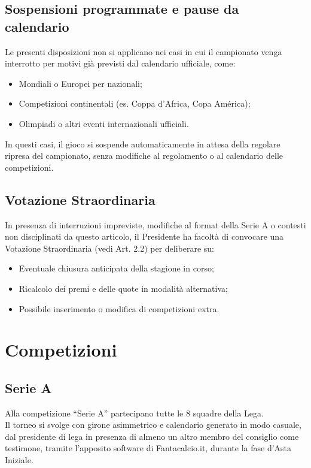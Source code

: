 \section{Sospensioni programmate e pause da calendario}
\label{art:7.3}

Le presenti disposizioni non si applicano nei casi in cui il campionato venga interrotto per motivi già previsti dal calendario ufficiale, come:
\begin{itemize}
  \item Mondiali o Europei per nazionali;
  \item Competizioni continentali (es. Coppa d’Africa, Copa América);
  \item Olimpiadi o altri eventi internazionali ufficiali.
\end{itemize}

In questi casi, il gioco si sospende automaticamente in attesa della regolare ripresa del campionato, senza modifiche al regolamento o al calendario delle competizioni.

\section{Votazione Straordinaria}
\label{art:7.4}

In presenza di interruzioni impreviste, modifiche al format della Serie A o contesti non disciplinati da questo articolo, il Presidente ha facoltà di convocare una Votazione Straordinaria (vedi Art. 2.2) per deliberare su:
\begin{itemize}
  \item Eventuale chiusura anticipata della stagione in corso;
  \item Ricalcolo dei premi e delle quote in modalità alternativa;
  \item Possibile inserimento o modifica di competizioni extra.
\end{itemize}


\chapter{Competizioni}
\label{cap:competizioni}

\section{Serie A}
\label{art:8.1}

Alla competizione “Serie A” partecipano tutte le 8 squadre della Lega.\\
Il torneo si svolge con girone asimmetrico e calendario generato in modo casuale, dal presidente di lega in presenza di almeno un altro membro del consiglio come testimone, tramite l’apposito software di Fantacalcio.it, durante la fase d’Asta Iniziale.

